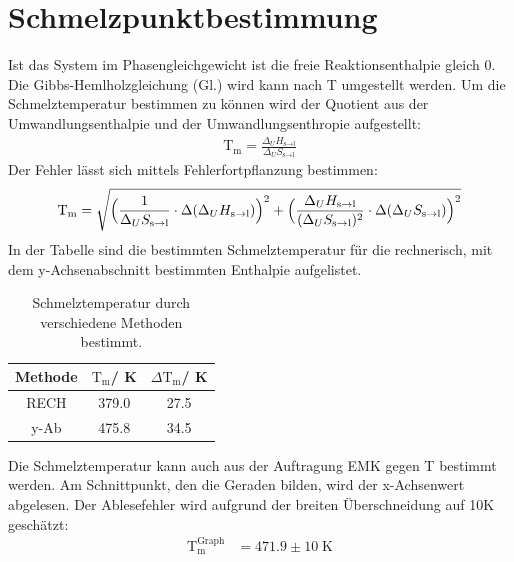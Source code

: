 \documentclass[12pt,a4paper,titlepage,headinclude,bibtotoc]{scrartcl}
\begin{document}
\section{Schmelzpunktbestimmung}
Ist das System im Phasengleichgewicht ist die freie Reaktionsenthalpie gleich 0. Die Gibbs-Hemlholzgleichung (Gl.) wird kann nach T umgestellt werden. Um die Schmelztemperatur bestimmen zu können wird der Quotient aus der Umwandlungsenthalpie und der Umwandlungsenthropie aufgestellt:
\begin{align}
\text{T}_{\text{m}}= \frac{\Delta_U H_{\text{s}\rightarrow\text{l}}}{\Delta_U S_{\text{s}\rightarrow\text{l}}}
\end{align}
Der Fehler lässt sich mittels Fehlerfortpflanzung bestimmen:
\begin{align}
\text{T}_{\text{m}}= \sqrt{\Bigl(\frac{1}{\Delta_U S_{\text{s}\rightarrow\text{l}}}\cdot \Delta(\Delta_U H_{\text{s}\rightarrow\text{l}})\Bigr)^2+\Bigl(\frac{\Delta_U H_{\text{s}\rightarrow\text{l}}}{(\Delta_U S_{\text{s}\rightarrow\text{l}})^2}\cdot \Delta(\Delta_U S_{\text{s}\rightarrow\text{l}})\Bigr)^2}
\end{align}
In der Tabelle\; sind die bestimmten Schmelztemperatur für die rechnerisch, mit dem y-Achsenabschnitt bestimmten Enthalpie aufgelistet.
\begin{table}[h]
\centering
\caption{Schmelztemperatur durch verschiedene Methoden bestimmt.}
\begin{tabular}{c|c|c}
Methode & $\text{T}_{\text{m}}$/ K& $\Delta\text{T}_{\text{m}}$/ K \\
\hline
RECH &379.0 &27.5 \\
y-Ab&475.8 & 34.5\\
\end{tabular}
\end{table}
\FloatBarrier
Die Schmelztemperatur kann auch aus der Auftragung EMK gegen T bestimmt werden. Am Schnittpunkt, den die Geraden bilden, wird der x-Achsenwert abgelesen. Der Ablesefehler wird aufgrund der breiten Überschneidung auf 10\;K geschätzt:
\begin{align}
\text{T}_{\text{m}}^{\text{Graph}}&= 471.9 \pm 10\;\text{K}
\end{align}
\end{document}
